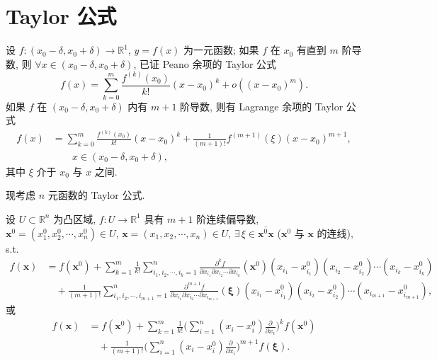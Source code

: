 
\section{Taylor 公式}\label{sec:8.3}

设 $f: (x_{0} - \delta, x_{0} + \delta) \to \mathbb{R}^{1}$, $y = f(x)$ 为一元函数; 如果 $f$ 在 $x_{0}$ 有直到 $m$ 阶导数, 则 $\forall x \in (x_{0} - \delta, x_{0} + \delta)$, 已证 Peano 余项的 Taylor 公式
\[
  f(x) = \sum_{k=0}^{m}\frac{f^{(k)}(x_{0})}{k!}(x - x_{0})^{k} + o((x - x_{0})^{m}).
\]
如果 $f$ 在 $(x_{0} - \delta, x_{0} + \delta)$ 内有 $m + 1$ 阶导数, 则有 Lagrange 余项的 Taylor 公式
\begin{align*}
  f(x) &= \sum_{k=0}^{m}\frac{f^{(k)}(x_{0})}{k!}(x - x_{0})^{k} + \frac{1}{(m + 1)!}f^{(m+1)}(\xi)(x - x_{0})^{m+1}, \\
  &\qquad x \in (x_{0} - \delta, x_{0} + \delta),
\end{align*}
其中 $\xi$ 介于 $x_{0}$ 与 $x$ 之间.

现考虑 $n$ 元函数的 Taylor 公式.

\begin{theorem}\label{thm:8.3.1}
设 $U \subset \mathbb{R}^{n}$ 为凸区域, $f: U \to \mathbb{R}^{1}$ 具有 $m + 1$ 阶连续偏导数, $\boldsymbol{x}^{0} = (x_{1}^{0}, x_{2}^{0}, \cdots, x_{n}^{0}) \in U$, $\boldsymbol{x} = (x_{1}, x_{2}, \cdots, x_{n}) \in U$, $\exists\, \xi \in \overline{\boldsymbol{x}^{0}\boldsymbol{x}}$ ($\boldsymbol{x}^{0}$ 与 $\boldsymbol{x}$ 的连线), s.t.
\begin{align*}
  f(\boldsymbol{x}) &= f(\boldsymbol{x}^{0}) + \sum_{k=1}^{m}\frac{1}{k!}\sum_{i_{1}, i_{2}, \cdots, i_{k}=1}^{n}\frac{\partial^{k}f}{\partial x_{i_{1}}\partial x_{i_{2}}\cdots\partial x_{i_{k}}}(\boldsymbol{x}^{0})(x_{i_{1}} - x_{i_{1}}^{0})(x_{i_{2}} - x_{i_{2}}^{0})\cdots(x_{i_{k}} - x_{i_{k}}^{0}) \\
  &\quad + \frac{1}{(m + 1)!}\sum_{i_{1}, i_{2}, \cdots, i_{m+1}=1}^{n}\frac{\partial^{m+1}f}{\partial x_{i_{1}}\partial x_{i_{2}}\cdots\partial x_{i_{m+1}}}(\boldsymbol{\xi})(x_{i_{1}} - x_{i_{1}}^{0})(x_{i_{2}} - x_{i_{2}}^{0})\cdots(x_{i_{m+1}} - x_{i_{m+1}}^{0}),
\end{align*}
或
\[
  \begin{aligned}
    f(\boldsymbol{x}) &= f(\boldsymbol{x}^{0}) + \sum_{k=1}^{m}\frac{1}{k!}\Big(\sum_{i=1}^{n}(x_{i} - x_{i}^{0})\frac{\partial}{\partial x_{i}}\Big)^{k}f(\boldsymbol{x}^{0}) \\
    &\quad + \frac{1}{(m + 1)!}\Big(\sum_{i=1}^{n}(x_{i} - x_{i}^{0})\frac{\partial}{\partial x_{i}}\Big)^{m+1}f(\boldsymbol{\xi}).
  \end{aligned}
\]
\end{theorem}

